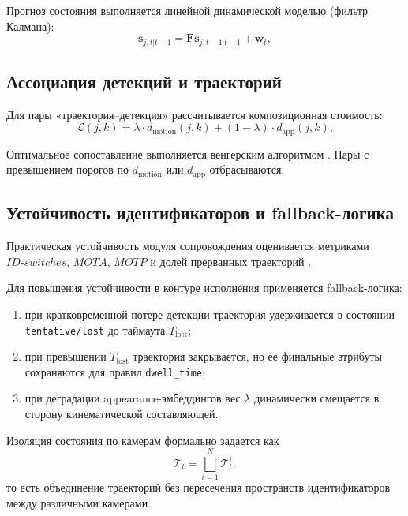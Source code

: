 Прогноз состояния выполняется линейной динамической моделью (фильтр Калмана):
\begin{equation}
\mathbf{s}_{j,t|t-1} = \mathbf{F}\mathbf{s}_{j,t-1|t-1} + \mathbf{w}_t,
\end{equation}
\where
{}

\subsection{Ассоциация детекций и траекторий}

Для пары «траектория--детекция» рассчитывается композиционная стоимость:
\begin{equation}
\mathcal{L}(j,k) = \lambda \cdot d_{\text{motion}}(j,k) + (1-\lambda)\cdot d_{\text{app}}(j,k),
\end{equation}
\where
{}

Оптимальное сопоставление выполняется венгерским алгоритмом \cite{kuhn1955hungarian}. Пары с превышением порогов по \(d_{\text{motion}}\) или \(d_{\text{app}}\) отбрасываются.

\subsection{Устойчивость идентификаторов и fallback-логика}

Практическая устойчивость модуля сопровождения оценивается метриками \(ID\text{-}switches\), \(MOTA\), \(MOTP\) и долей прерванных траекторий \cite{bernardin2008motmetrics,motchallenge}.

Для повышения устойчивости в контуре исполнения применяется fallback-логика:
\begin{enumerate}
    \item при кратковременной потере детекции траектория удерживается в состоянии \texttt{tentative/lost} до таймаута \(T_{\text{lost}}\);
    \item при превышении \(T_{\text{lost}}\) траектория закрывается, но ее финальные атрибуты сохраняются для правил \texttt{dwell\_time};
    \item при деградации appearance-эмбеддингов вес \(\lambda\) динамически смещается в сторону кинематической составляющей.
\end{enumerate}

Изоляция состояния по камерам формально задается как
\begin{equation}
\mathcal{T}_t = \bigsqcup_{i=1}^{N}\mathcal{T}^i_t,
\end{equation}
то есть объединение траекторий без пересечения пространств идентификаторов между различными камерами.


